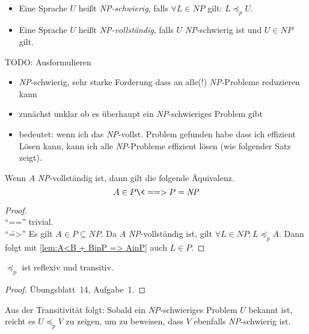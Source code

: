 
\begin{Def}[name={[\textit{NP}-schwierig und \textit{NP}-vollständig]}]\
	\begin{itemize}
	\item Eine Sprache $U$ heißt \emph{\textit{NP}-schwierig}, falls $\forall L\in \textit{NP}$ gilt: $L\preceq_p U$.
	\item Eine Sprache $U$ heißt \emph{\textit{NP}-vollständig}, falls $U$ \textit{NP}-schwierig ist und $U\in \textit{NP}$ gilt. \qedhere
	\end{itemize}
\end{Def}

{\color{red}
TODO: Ausformulieren
\begin{itemize}
 \item \textit{NP}-schwierig, sehr starke Forderung dass an alle(!) \textit{NP}-Probleme reduzieren kann
 \item zunächst unklar ob es überhaupt ein \textit{NP}-schwieriges Problem gibt
 \item bedeutet: wenn ich das \textit{NP}-vollst. Problem gefunden habe dass ich effizient Lösen kann, kann ich alle \textit{NP}-Probleme effizient lösen (wie folgender Satz zeigt).
\end{itemize}
}
\begin{Satz}
	Wenn $A$ \textit{NP}-vollständig ist, dann gilt die folgende Äquivalenz.
	\[ A\in P \<==> P=\textit{NP} \qedhere \]
\end{Satz}
\begin{proof}\ \\
	"`\<=="' trivial.\\
	"`\==>"' Es gilt $A\in P\subseteq NP$. Da $A$ \textit{NP}-vollständig ist, gilt $\forall L\in NP: L\preceq_p A$. Dann folgt mit \autoref{lem:A<B + BinP => AinP} auch $L\in P$.
\end{proof}

\begin{lemma}[name={[$\preceq_p$ ist reflexiv und transitiv]}]
	$\preceq_p$ ist reflexiv und transitiv.
\end{lemma}
\begin{proof}
Übungsblatt~14, Aufgabe~1.
\end{proof}

\begin{Bem}
    Aus der Transitivität folgt:
	Sobald ein \textit{NP}-schwieriges Problem $U$ bekannt ist, reicht es $U\preceq_p V$ zu zeigen, um zu beweisen, dass $V$ ebenfalls \textit{NP}-schwierig ist.
\end{Bem}

